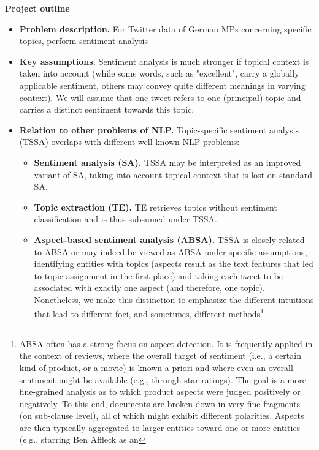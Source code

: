 \textbf{Project outline}

\begin{itemize}
  \item \textbf{Problem description.} For Twitter data of German MPs concerning 
  specific topics, perform sentiment analysis
  \item \textbf{Key assumptions.} Sentiment analysis is much stronger if topical 
  context is taken into account (while some words, such as "excellent", carry a
  globally applicable sentiment, others may convey quite different meanings in 
  varying context). We will assume that one tweet refers to one (principal) 
  topic and carries a distinct sentiment towards this topic.
  \item \textbf{Relation to other problems of NLP.} Topic-specific sentiment 
  analysis (TSSA) overlaps with different well-known NLP problems:
  \begin{itemize}
    \item \textbf{Sentiment analysis (SA).} TSSA may be interpreted as an 
    improved variant of SA, taking into account topical context that is lost on 
    standard SA.
    \item \textbf{Topic extraction (TE).} TE retrieves topics without sentiment 
    classification and is thus subsumed under TSSA.
    \item \textbf{Aspect-based sentiment analysis (ABSA).} TSSA is closely 
    related to ABSA or may indeed be viewed as ABSA under specific assumptions, 
    identifying entities with topics (aspects result as the text features that 
    led to topic assignment in the first place) and taking each tweet to be 
    associated with exactly one aspect (and therefore, one topic).
    Nonetheless, we make this distinction to emphasize the different intuitions  
    that lead to different foci, and sometimes, different methods\footnote{
    ABSA often has a strong focus on aspect detection. It is frequently applied 
    in the context of reviews, where the overall target of sentiment 
    (i.e., a certain kind of product, or a movie) is known a priori and where 
    even an overall sentiment might be available (e.g., through star ratings). 
    The goal is a more fine-grained analysis as to which product aspects were 
    judged positively or negatively. To this end, documents are broken down 
    in very fine fragments (on sub-clause level), all of which might exhibit
    different polarities. Aspects are then typically aggregated to larger 
    entities toward one or more entities (e.g., starring Ben Affleck as an 
}
\end{itemize}
\end{itemize}
